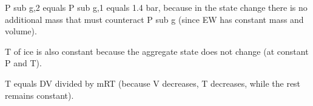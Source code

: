 P sub g,2 equals P sub g,1 equals 1.4 bar, because in the state change there is no additional mass that must counteract P sub g (since EW has constant mass and volume).  

T of ice is also constant because the aggregate state does not change (at constant P and T).  

T equals DV divided by mRT (because V decreases, T decreases, while the rest remains constant).